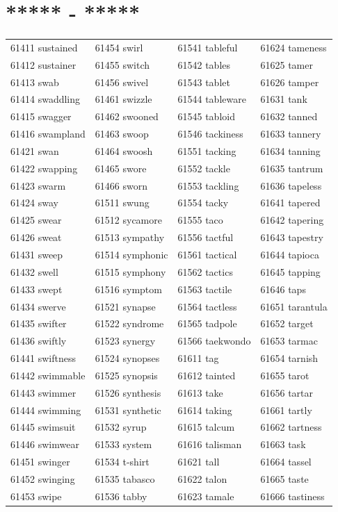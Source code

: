 \documentclass[10pt, oneside]{book}
\begin{document}
\begin{table}[h]
	\centering
	\section*{***** - *****}
	\begin{tabular}{l l l l}
61411 sustained &61454 swirl &61541 tableful &61624 tameness\\
61412 sustainer &61455 switch &61542 tables &61625 tamer\\
61413 swab &61456 swivel &61543 tablet &61626 tamper\\
61414 swaddling &61461 swizzle &61544 tableware &61631 tank\\
61415 swagger &61462 swooned &61545 tabloid &61632 tanned\\
61416 swampland &61463 swoop &61546 tackiness &61633 tannery\\
61421 swan &61464 swoosh &61551 tacking &61634 tanning\\
61422 swapping &61465 swore &61552 tackle &61635 tantrum\\
61423 swarm &61466 sworn &61553 tackling &61636 tapeless\\
61424 sway &61511 swung &61554 tacky &61641 tapered\\
61425 swear &61512 sycamore &61555 taco &61642 tapering\\
61426 sweat &61513 sympathy &61556 tactful &61643 tapestry\\
61431 sweep &61514 symphonic &61561 tactical &61644 tapioca\\
61432 swell &61515 symphony &61562 tactics &61645 tapping\\
61433 swept &61516 symptom &61563 tactile &61646 taps\\
61434 swerve &61521 synapse &61564 tactless &61651 tarantula\\
61435 swifter &61522 syndrome &61565 tadpole &61652 target\\
61436 swiftly &61523 synergy &61566 taekwondo &61653 tarmac\\
61441 swiftness &61524 synopses &61611 tag &61654 tarnish\\
61442 swimmable &61525 synopsis &61612 tainted &61655 tarot\\
61443 swimmer &61526 synthesis &61613 take &61656 tartar\\
61444 swimming &61531 synthetic &61614 taking &61661 tartly\\
61445 swimsuit &61532 syrup &61615 talcum &61662 tartness\\
61446 swimwear &61533 system &61616 talisman &61663 task\\
61451 swinger &61534 t-shirt &61621 tall &61664 tassel\\
61452 swinging &61535 tabasco &61622 talon &61665 taste\\
61453 swipe &61536 tabby &61623 tamale &61666 tastiness\\
	\end{tabular}
 \end{table}
\end{document}
